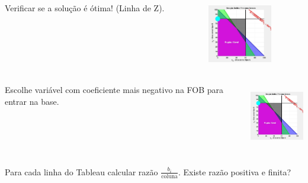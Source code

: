 \begin{frame}
{\begin{columns}
\begin{column}{0.5\textwidth}
		\end{column}
	\end{columns}	
	}
	{
	\begin{columns}
		\begin{column}{0.5\textwidth}
			\centering
			\begin{mdframed}[backgroundcolor=orange!80]
				Verificar se a solução é ótima! (Linha de Z).
			\end{mdframed}
		\end{column}
		\begin{column}{0.5\textwidth}
			\centering
			\includegraphics[width=2.8cm,height=2.8cm]{Exaustiva_7.jpeg}
		\end{column}
	\end{columns}
	}
	\only<6>
	{
	\begin{columns}
		\begin{column}{0.5\textwidth}
			\centering
			\begin{mdframed}[backgroundcolor=olive!80]
				Escolhe variável com coeficiente mais negativo na FOB para entrar na base.
			\end{mdframed}
		\end{column}
		\begin{column}{0.5\textwidth}
			\centering
			\includegraphics[width=2.8cm,height=2.8cm]{Exaustiva_7.jpeg}
		\end{column}
	\end{columns}	
	}
	\only<7>
	{
	\begin{columns}
		\begin{column}{0.5\textwidth}
			\centering
			\begin{mdframed}[backgroundcolor=orange!80]
				Para cada linha do Tableau calcular razão $\frac{b_i}{\text{coluna}}$. Existe razão positiva e finita?
			\end{mdframed}

\end{column}
\end{columns}}
\end{frame}
